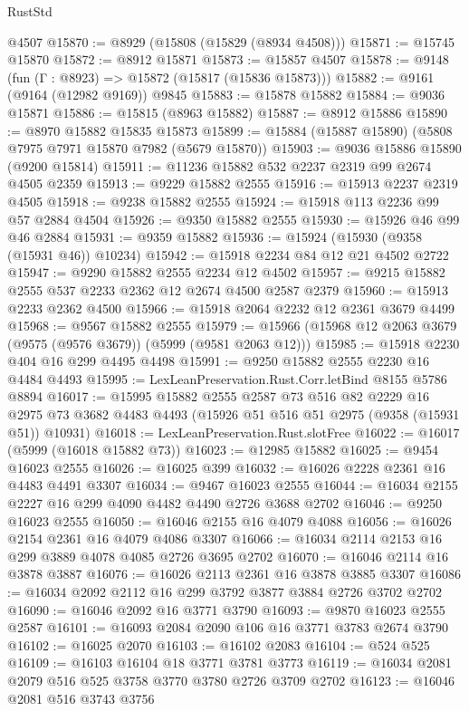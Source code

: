 \begin{lexlean}{RustStd}
\begin{coremodule}
    @4507
@15870 := @8929 (@15808 (@15829 (@8934 @4508)))
@15871 := @15745 @15870
@15872 := @8912 @15871
@15873 := @15857 @4507
@15878 := @9148 (fun (Γ : @8923) => @15872 (@15817 (@15836 @15873)))
@15882 := @9161 (@9164 (@12982 @9169)) @9845
@15883 := @15878 @15882
@15884 := @9036 @15871
@15886 := @15815 (@8963 @15882)
@15887 := @8912 @15886
@15890 := @8970 @15882 @15835 @15873
@15899 := @15884 (@15887 @15890) (@5808 @7975 @7971 @15870 @7982 (@5679 @15870))
@15903 := @9036 @15886 @15890 (@9200 @15814)
@15911 := @11236 @15882 @532 @2237 @2319 @99 @2674 @4505 @2359
@15913 := @9229 @15882 @2555
@15916 := @15913 @2237 @2319 @4505
@15918 := @9238 @15882 @2555
@15924 := @15918 @113 @2236 @99 @57 @2884 @4504
@15926 := @9350 @15882 @2555
@15930 := @15926 @46 @99 @46 @2884
@15931 := @9359 @15882
@15936 := @15924 (@15930 (@9358 (@15931 @46)) @10234)
@15942 := @15918 @2234 @84 @12 @21 @4502 @2722
@15947 := @9290 @15882 @2555 @2234 @12 @4502
@15957 := @9215 @15882 @2555 @537 @2233 @2362 @12 @2674 @4500 @2587 @2379
@15960 := @15913 @2233 @2362 @4500
@15966 := @15918 @2064 @2232 @12 @2361 @3679 @4499
@15968 := @9567 @15882 @2555
@15979 := @15966 (@15968 @12 @2063 @3679 (@9575 (@9576 @3679)) (@5999 (@9581 @2063 @12)))
@15985 := @15918 @2230 @404 @16 @299 @4495 @4498
@15991 := @9250 @15882 @2555 @2230 @16 @4484 @4493
@15995 := LexLeanPreservation.Rust.Corr.letBind @8155 @5786 @8894
@16017 := @15995
    @15882
    @2555
    @2587
    @73
    @516
    @82
    @2229
    @16
    @2975
    @73
    @3682
    @4483
    @4493
    (@15926 @51 @516 @51 @2975 (@9358 (@15931 @51)) @10931)
@16018 := LexLeanPreservation.Rust.slotFree
@16022 := @16017 (@5999 (@16018 @15882 @73))
@16023 := @12985 @15882
@16025 := @9454 @16023 @2555
@16026 := @16025 @399
@16032 := @16026 @2228 @2361 @16 @4483 @4491 @3307
@16034 := @9467 @16023 @2555
@16044 := @16034 @2155 @2227 @16 @299 @4090 @4482 @4490 @2726 @3688 @2702
@16046 := @9250 @16023 @2555
@16050 := @16046 @2155 @16 @4079 @4088
@16056 := @16026 @2154 @2361 @16 @4079 @4086 @3307
@16066 := @16034 @2114 @2153 @16 @299 @3889 @4078 @4085 @2726 @3695 @2702
@16070 := @16046 @2114 @16 @3878 @3887
@16076 := @16026 @2113 @2361 @16 @3878 @3885 @3307
@16086 := @16034 @2092 @2112 @16 @299 @3792 @3877 @3884 @2726 @3702 @2702
@16090 := @16046 @2092 @16 @3771 @3790
@16093 := @9870 @16023 @2555 @2587
@16101 := @16093 @2084 @2090 @106 @16 @3771 @3783 @2674 @3790
@16102 := @16025 @2070
@16103 := @16102 @2083
@16104 := @524 @525
@16109 := @16103 @16104 @18 @3771 @3781 @3773
@16119 := @16034 @2081 @2079 @516 @525 @3758 @3770 @3780 @2726 @3709 @2702
@16123 := @16046 @2081 @516 @3743 @3756

\end{coremodule}
\end{lexlean}
